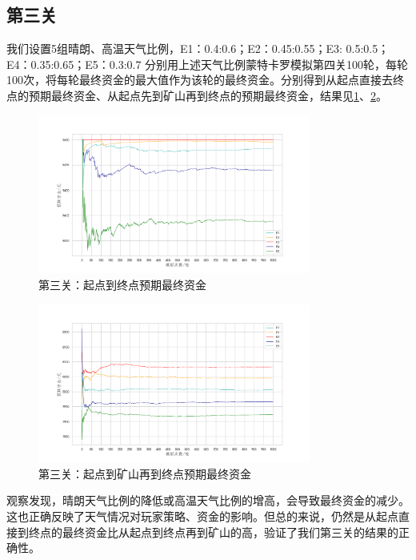 \documentclass[withoutpre]{cumcmthesis} %
\begin{document}
\subsection{第三关}
我们设置5组晴朗、高温天气比例，E1：0.4:0.6；E2：0.45:0.55；E3: 0.5:0.5；E4：0.35:0.65；E5：0.3:0.7
分别用上述天气比例蒙特卡罗模拟第四关100轮，每轮100次，将每轮最终资金的最大值作为该轮的最终资金。分别得到从起点直接去终点的预期最终资金、从起点先到矿山再到终点的预期最终资金，结果见\cref{fig:analysis3map1}、\cref{fig:analysis3map2}。
\begin{figure}[H]
    \centering
    \includegraphics[width=0.8\textwidth]{figures/analysis3map1.png}
    \caption{第三关：起点到终点预期最终资金}
    \label{fig:analysis3map1}
\end{figure}


\begin{figure}[H]
    \centering
    \includegraphics[width=0.8\textwidth]{figures/analysis3map2.png}
    \caption{第三关：起点到矿山再到终点预期最终资金}
    \label{fig:analysis3map2}
\end{figure}
观察发现，晴朗天气比例的降低或高温天气比例的增高，会导致最终资金的减少。这也正确反映了天气情况对玩家策略、资金的影响。但总的来说，仍然是从起点直接到终点的最终资金比从起点到终点再到矿山的高，验证了我们第三关的结果的正确性。
\end{document}
